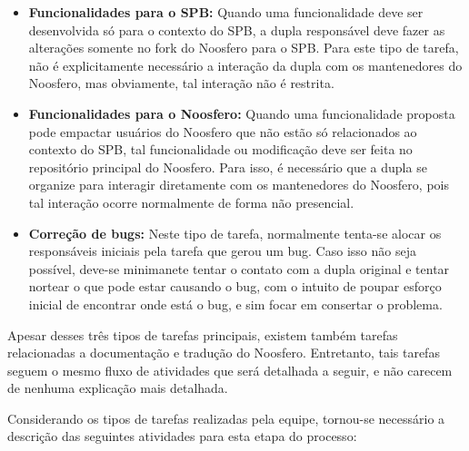 \documentclass[a4paper, 11pt]{article}
\begin{document}
\begin{itemize}
    \item \textbf{Funcionalidades para o SPB:} Quando uma funcionalidade deve
        ser desenvolvida só para o contexto do SPB, a dupla responsável deve
        fazer as alterações somente no fork do Noosfero para o SPB. Para este
        tipo de tarefa, não é explicitamente necessário a interação da dupla com
        os mantenedores do Noosfero, mas obviamente, tal interação não é
        restrita.
    \item \textbf{Funcionalidades para o Noosfero:} Quando uma funcionalidade
        proposta pode empactar usuários do Noosfero que não estão só
        relacionados ao contexto do SPB, tal funcionalidade ou modificação deve
        ser feita no repositório principal do Noosfero. Para isso, é necessário
        que a dupla se organize para interagir diretamente com os mantenedores
        do Noosfero, pois tal interação ocorre normalmente de forma não
        presencial.
    \item \textbf{Correção de bugs:} Neste tipo de tarefa, normalmente tenta-se
        alocar os responsáveis iniciais pela tarefa que gerou um bug. Caso isso
        não seja possível, deve-se minimanete tentar o contato com a dupla
        original e tentar nortear o que pode estar causando o bug, com o intuito
        de poupar esforço inicial de encontrar onde está o bug, e sim focar em
        consertar o problema.
\end{itemize}

Apesar desses três tipos de tarefas principais, existem também tarefas
relacionadas a documentação e tradução do Noosfero. Entretanto, tais tarefas
seguem o mesmo fluxo de atividades que será detalhada a seguir, e não carecem de
nenhuma explicação mais detalhada.

Considerando os tipos de tarefas realizadas pela equipe, tornou-se necessário
a descrição das seguintes atividades para esta etapa do processo:
\end{document}
